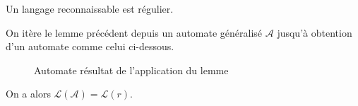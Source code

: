 \begin{thm}
	Un langage reconnaissable est régulier.
\end{thm}

\begin{prv}
	On itère le lemme précédent depuis un automate généralisé $\mathcal{A}$\/ jusqu'à obtention d'un automate comme celui ci-dessous.
	\begin{figure}[H]
		\centering
		\caption{Automate résultat de l'application du lemme}
	\end{figure}
	On a alors $\mathcal{L}(\mathcal{A}) = \mathcal{L}(r)$.
\end{prv}

